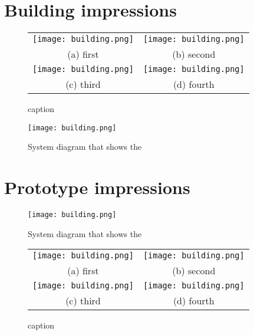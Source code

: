 \begin{appendices}
\section{Building impressions}
\label{appendix:building}

\begin{figure}[H]
\begin{minipage}{.5\textwidth}
\begin{tabular}{cc}
  \texttt{[image: building.png]} &   \texttt{[image: building.png]} \\
(a) first & (b) second \\[6pt]
 \texttt{[image: building.png]} &   \texttt{[image: building.png]} \\
(c) third & (d) fourth \\[6pt]
\end{tabular}
\caption{caption}
\end{minipage}%
\begin{minipage}{.5\textwidth}
    \centering
    \texttt{[image: building.png]}
    \caption{System diagram that shows the }
    \label{fig:timeline}
\end{minipage}%
\end{figure}

\section{Prototype impressions}
\label{sec:apx:first_appendix}

\begin{figure}[H]
\begin{minipage}{.5\textwidth}
    \centering
    \texttt{[image: building.png]}
    \caption{System diagram that shows the }
    \label{fig:timeline}
\end{minipage}%
\begin{minipage}{.5\textwidth}
\begin{tabular}{cc}
  \texttt{[image: building.png]} &   \texttt{[image: building.png]} \\
(a) first & (b) second \\[6pt]
 \texttt{[image: building.png]} &   \texttt{[image: building.png]} \\
(c) third & (d) fourth \\[6pt]
\end{tabular}
\caption{caption}
\end{minipage}%
\end{figure}


\end{appendices}
